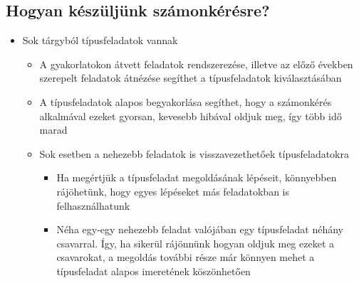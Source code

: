 \documentclass[../Main.tex]{subfiles}
\begin{document}
\subsection{Hogyan készüljünk számonkérésre?}

\begin{itemize}
    \item Sok tárgyból típusfeladatok vannak
    \begin{itemize}
        \item A gyakorlatokon átvett feladatok rendszerezése, illetve az előző években
        szerepelt feladatok átnézése segíthet a típusfeladatok kiválasztásában
        \item A típusfeladatok alapos begyakorlása segíthet, hogy a számonkérés
        alkalmával ezeket gyorsan, kevesebb hibával oldjuk meg, így több idő marad
        \item Sok esetben a nehezebb feladatok is visszavezethetőek típusfeladatokra
        \begin{itemize}
            \item Ha megértjük a típusfeladat megoldásának lépéseit, könnyebben
            rájöhetünk, hogy egyes lépéseket más feladatokban is
            felhasználhatunk
            \item Néha egy-egy nehezebb feladat valójában egy típusfeladat néhány
            csavarral. Így, ha sikerül rájönnünk hogyan oldjuk meg ezeket a
            csavarokat, a megoldás további része már könnyen mehet a
            típusfeladat alapos imeretének köszönhetően
        \end{itemize}
    \end{itemize}


\end{itemize}
\end{document}

